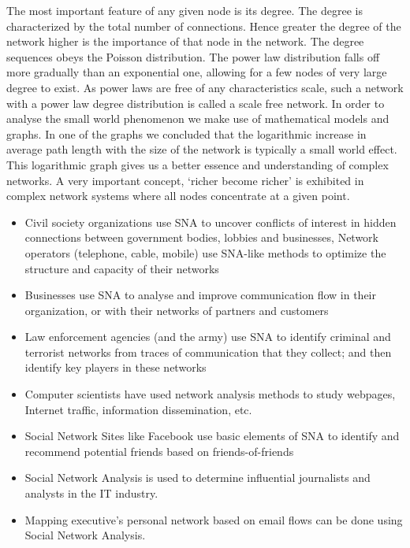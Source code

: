 
The most important feature of any given node is its degree. The degree is characterized by the total number of connections. Hence greater the degree of the network higher is the importance of that node in the network. The degree sequences obeys the Poisson distribution. The power law distribution falls off more gradually than an exponential one, allowing for a few nodes of very large degree to exist. As power laws are free of any characteristics scale, such a network with a power law degree distribution is called a scale free network. In order to analyse the small world phenomenon we make use of mathematical models and graphs. In one of the graphs we concluded that the logarithmic increase in average path length with the size of the network is typically a small world effect. This logarithmic graph gives us a better essence and understanding of complex networks. A very important concept, `richer become richer' is exhibited in complex network systems where all nodes concentrate at a given point.


\begin{itemize}
\item Civil society organizations use SNA to uncover conflicts of interest in hidden connections between government bodies, lobbies and businesses, Network operators (telephone, cable, mobile) use SNA-like methods to optimize the structure and capacity of their networks
\item Businesses use SNA to analyse and improve communication flow in their organization, or with their networks of partners and customers
\item Law enforcement agencies (and the army) use SNA to identify criminal and terrorist networks from traces of communication that they collect; and then identify key players in these networks
\item Computer scientists have used network analysis methods to study webpages, Internet traffic, information dissemination, etc.
\item Social Network Sites like Facebook use basic elements of SNA to identify and recommend potential friends based on friends-of-friends
\item Social Network Analysis is used to determine influential journalists and analysts in the IT industry.
\item Mapping executive’s personal network based on email flows can be done using Social Network Analysis.
\end{itemize}


